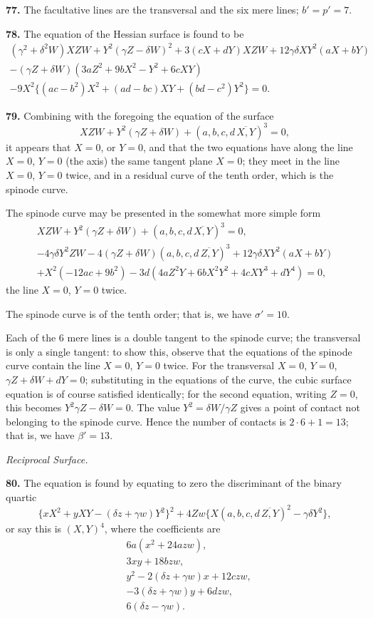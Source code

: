\documentclass[11pt,a4paper]{article}
\theoremstyle{definition}
\begin{document}
\textbf{77.} The facultative lines are the transversal and the six mere lines; $b' = p' = 7$.

\textbf{78.} The equation of the Hessian surface is found to be
\begin{multline*}
(\gamma^2 + \delta^2W)XZW + Y^2(\gamma Z - \delta W)^2 + 3(cX + dY)XZW + 12\gamma\delta XY^2(aX + bY) \\
- (\gamma Z + \delta W)(3aZ^2 + 9bX^2 - Y^2 + 6cXY) \\
- 9X^2\{(ac - b^2)X^2 + (ad - bc)XY + (bd - c^2)Y^2\} = 0.
\end{multline*}

\textbf{79.} Combining with the foregoing the equation of the surface
\[
XZW + Y^2(\gamma Z + \delta W) + (a, b, c, d \,\overline{\!\!X, Y\!\!})^3 = 0,
\]
it appears that $X = 0$, or $Y = 0$, and that the two equations have along the line $X = 0$, $Y = 0$ (the axis) the same tangent plane $X = 0$; they meet in the line $X = 0$, $Y = 0$ twice, and in a residual curve of the tenth order, which is the spinode curve.

The spinode curve may be presented in the somewhat more simple form
\begin{multline*}
XZW + Y^2(\gamma Z + \delta W) + (a, b, c, d \,\overline{\!\!X, Y\!\!})^3 = 0, \\
-4\gamma\delta Y^2ZW - 4(\gamma Z + \delta W)(a, b, c, d \,\overline{\!\!Z, Y\!\!})^3 + 12\gamma\delta XY^2(aX + bY) \\
+ X^2(-12ac + 9b^2) - 3d(4aZ^2Y + 6bX^2Y^2 + 4cXY^3 + dY^4) = 0,
\end{multline*}
the line $X = 0$, $Y = 0$ twice.

The spinode curve is of the tenth order; that is, we have $\sigma' = 10$.

Each of the 6 mere lines is a double tangent to the spinode curve; the transversal is only a single tangent: to show this, observe that the equations of the spinode curve contain the line $X = 0$, $Y = 0$ twice. For the transversal $X = 0$, $Y = 0$, $\gamma Z + \delta W + dY = 0$; substituting in the equations of the curve, the cubic surface equation is of course satisfied identically; for the second equation, writing $Z = 0$, this becomes $Y^2\gamma Z - \delta W = 0$. The value $Y^2 = \delta W/\gamma Z$ gives a point of contact not belonging to the spinode curve. Hence the number of contacts is $2 \cdot 6 + 1 = 13$; that is, we have $\beta' = 13$.

\textit{Reciprocal Surface.}

\textbf{80.} The equation is found by equating to zero the discriminant of the binary quartic
\[
\{xX^2 + yXY - (\delta z + \gamma w)Y^2\}^2 + 4Zw\{X(a, b, c, d \,\overline{\!\!Z, Y\!\!})^2 - \gamma\delta Y^2\},
\]
or say this is $(\!\!X, Y\!\!)^4$, where the coefficients are
\begin{align*}
&6a(x^2 + 24azw), \\
&3xy + 18bzw, \\
&y^2 - 2(\delta z + \gamma w)x + 12czw, \\
&-3(\delta z + \gamma w)y + 6dzw, \\
&6(\delta z - \gamma w).
\end{align*}
\end{document}
